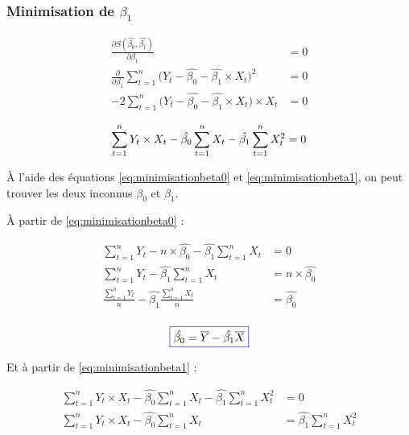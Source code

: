 \documentclass[11pt,french]{report}
\begin{document}
\subsubsection*{Minimisation de $\beta_1$}
\begin{align*}
\frac{\partial S(\hat{\beta_0}, \hat{\beta_1})}{\partial \beta_1} &= 0 \\
\frac{\partial}{\partial \beta_1} \sum_{t=1}^n \big( Y_t - \hat{\beta_0} - \hat{\beta_1}\times X_t \big)^2 &= 0 \\
-2\sum_{t=1}^n \big( Y_t - \hat{\beta_0} - \hat{\beta_1} \times X_t \big) \times X_t &= 0 \\
\end{align*}
\begin{equation}
\label{eq:minimisationbeta1}
\sum_{t=1}^n Y_t \times X_t - \hat{\beta_0} \sum_{t=1}^n X_t - \hat{\beta_1} \sum_{t=1}^n X_t^2 = 0 \\
\end{equation}

À l'aide des équations \ref{eq:minimisationbeta0} et \ref{eq:minimisationbeta1}, on peut trouver les deux inconnus $\beta_0$ et $\beta_1$.

À partir de \ref{eq:minimisationbeta0} :

\begin{align*}
\sum_{t=1}^n Y_t - n \times \hat{\beta_0} - \hat{\beta_1} \sum_{t=1}^n X_t &= 0 \\
\sum_{t=1}^n Y_t - \hat{\beta_1} \sum_{t=1}^n X_t &=  n \times \hat{\beta_0} \\
\frac{\sum_{t=1}^n Y_t}{n} - \hat{\beta_1} \frac{\sum_{t=1}^n X_t}{n} &=  \hat{\beta_0} \\
\end{align*}

\begin{equation}
\label{eq:beta0}
\color{blue}
\boxed{\color{black}
\hat{\beta_0} = \overline{Y} - \hat{\beta_1} \overline{X}}
\end{equation}

Et à partir de \ref{eq:minimisationbeta1} :

\begin{align*}
\sum_{t=1}^n Y_t \times X_t - \hat{\beta_0} \sum_{t=1}^n X_t - \hat{\beta_1} \sum_{t=1}^n X_t^2 &= 0 \\
\sum_{t=1}^n Y_t \times X_t - \hat{\beta_0} \sum_{t=1}^n X_t &=  \hat{\beta_1} \sum_{t=1}^n X_t^2 \\
\end{align*}
\end{document}
